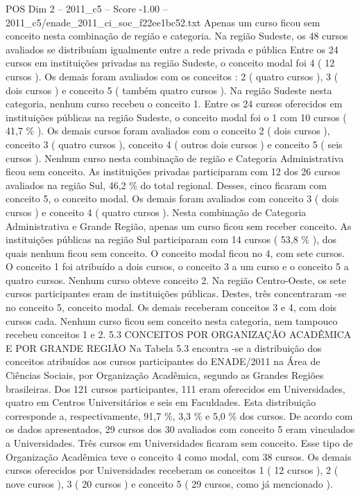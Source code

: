 \begin{textsample}{POS Dim 2 – 2011\_c5 – Score -1.00 – 2011\_c5/enade\_2011\_ci\_soc\_f22ee1bc52.txt}
Apenas um curso ficou sem conceito nesta combinação de região e categoria.
Na região Sudeste, os 48 cursos avaliados se distribuíam igualmente entre a rede privada e pública Entre os 24 cursos em instituições privadas na região Sudeste, o conceito modal foi 4 ( 12 cursos ).
Os demais foram avaliados com os conceitos : 2 ( quatro cursos ), 3 ( dois cursos ) e conceito 5 ( também quatro cursos ).
Na região Sudeste nesta categoria, nenhum curso recebeu o conceito 1.
Entre os 24 cursos oferecidos em instituições públicas na região Sudeste, o conceito modal foi o 1 com 10 cursos ( 41,7 \% ).
Os demais cursos foram avaliados com o conceito 2 ( dois cursos ), conceito 3 ( quatro cursos ), conceito 4 ( outros dois cursos ) e conceito 5 ( seis cursos ).
Nenhum curso nesta combinação de região e Categoria Administrativa ficou sem conceito.
As instituições privadas participaram com 12 dos 26 cursos avaliados na região Sul, 46,2 \% do total regional.
Desses, cinco ficaram com conceito 5, o conceito modal.
Os demais foram avaliados com conceito 3 ( dois cursos ) e conceito 4 ( quatro cursos ).
Nesta combinação de Categoria Administrativa e Grande Região, apenas um curso ficou sem receber conceito.
As instituições públicas na região Sul participaram com 14 cursos ( 53,8 \% ), dos quais nenhum ficou sem conceito.
O conceito modal ficou no 4, com sete cursos.
O conceito 1 foi atribuído a dois cursos, o conceito 3 a um curso e o conceito 5 a quatro cursos.
Nenhum curso obteve conceito 2.
Na região Centro-Oeste, os sete cursos participantes eram de instituições públicas.
Destes, três concentraram -se no conceito 5, conceito modal.
Os demais receberam conceitos 3 e 4, com dois cursos cada.
Nenhum curso ficou sem conceito nesta categoria, nem tampouco recebeu conceitos 1 e 2. 5.3 CONCEITOS POR ORGANIZAÇÃO ACADÊMICA E POR GRANDE REGIÃO Na Tabela 5.3 encontra -se a distribuição dos conceitos atribuídos aos cursos participantes do ENADE/2011 na Área de Ciências Sociais, por Organização Acadêmica, segundo as Grandes Regiões brasileiras.
Dos 121 cursos participantes, 111 eram oferecidos em Universidades, quatro em Centros Universitários e seis em Faculdades.
Esta distribuição corresponde a, respectivamente, 91,7 \%, 3,3 \% e 5,0 \% dos cursos.
De acordo com os dados apresentados, 29 cursos dos 30 avaliados com conceito 5 eram vinculados a Universidades.
Três cursos em Universidades ficaram sem conceito.
Esse tipo de Organização Acadêmica teve o conceito 4 como modal, com 38 cursos.
Os demais cursos oferecidos por Universidades receberam os conceitos 1 ( 12 cursos ), 2 ( nove cursos ), 3 ( 20 cursos ) e conceito 5 ( 29 cursos, como já mencionado ).

\end{textsample}
